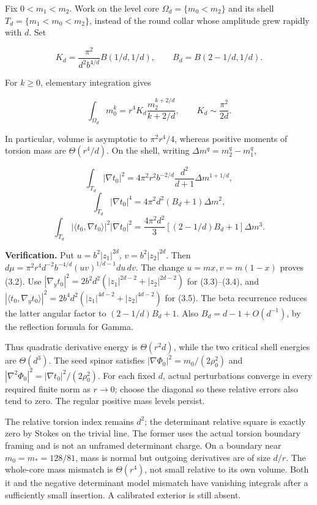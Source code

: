 \documentclass[
  10pt,
]{article}
\begin{document}
Fix \(0<m_1<m_2\). Work on the level core \(\Omega_d=\{m_0<m_2\}\) and
its shell \(T_d=\{m_1<m_0<m_2\}\), instead of the round collar whose
amplitude grew rapidly with \(d\). Set

\[
 K_d=\frac{\pi^2}{d^2b^{4/d}}B(1/d,1/d),\qquad
 B_d=B(2-1/d,1/d).
\]

For \(k\ge0\), elementary integration gives

\[
 \int_{\Omega_d}m_0^k
 =r^4K_d\frac{m_2^{k+2/d}}{k+2/d},\qquad
 K_d\sim\frac{\pi^2}{2d}.
 \tag{3.2}
\]

In particular, volume is asymptotic to \(\pi^2r^4/4\), whereas positive
moments of torsion mass are \(\Theta(r^4/d)\). On the shell, writing
\(\Delta m^q=m_2^q-m_1^q\),

\[
 \int_{T_d}|\nabla t_0|^2
 =4\pi^2r^2b^{-2/d}\frac{d^2}{d+1}\Delta m^{1+1/d},
 \tag{3.3}
\] \[
 \int_{T_d}|\nabla t_0|^4
 =4\pi^2d^2(B_d+1)\Delta m^2,
 \tag{3.4}
\] \[
 \int_{T_d}|\langle t_0,\nabla t_0\rangle|^2|\nabla t_0|^2
 =\frac{4\pi^2d^2}{3}
       [(2-1/d)B_d+1]\Delta m^3.
 \tag{3.5}
\]

\textbf{Verification.} Put \(u=b^2|z_1|^{2d}\), \(v=b^2|z_2|^{2d}\).
Then \(d\mu=\pi^2r^4d^{-2}b^{-4/d}(uv)^{1/d-1}du\,dv\). The change
\(u=mx,v=m(1-x)\) proves (3.2). Use
\(|\nabla_y t_0|^2=2b^2d^2(|z_1|^{2d-2}+|z_2|^{2d-2})\) for
(3.3)--(3.4), and
\(|\langle t_0,\nabla_y t_0\rangle|^2 =2b^4d^2(|z_1|^{4d-2}+|z_2|^{4d-2})\)
for (3.5). The beta recurrence reduces the latter angular factor to
\((2-1/d)B_d+1\). Also \(B_d=d-1+O(d^{-1})\), by the reflection formula
for Gamma.

Thus quadratic derivative energy is \(\Theta(r^2d)\), while the two
critical shell energies are \(\Theta(d^3)\). The seed spinor satisfies
\(|\nabla\Phi_0|^2=m_0/(2\rho_0^2)\) and
\(|\nabla^2\Phi_0|^2=|\nabla t_0|^2/(2\rho_0^2)\). For each fixed \(d\),
actual perturbations converge in every required finite norm as
\(r\to0\); choose the diagonal so these relative errors also tend to
zero. The regular positive mass levels persist.

The relative torsion index remains \(d^2\); the determinant relative
square is exactly zero by Stokes on the trivial line. The former uses
the actual torsion boundary framing and is not an unframed determinant
charge. On a boundary near \(m_0=m_*=128/81\), mass is normal but
outgoing derivatives are of size \(d/r\). The whole-core mass mismatch
is \(\Theta(r^4)\), not small relative to its own volume. Both it and
the negative determinant model mismatch have vanishing integrals after a
sufficiently small insertion. A calibrated exterior is still absent.
\end{document}
